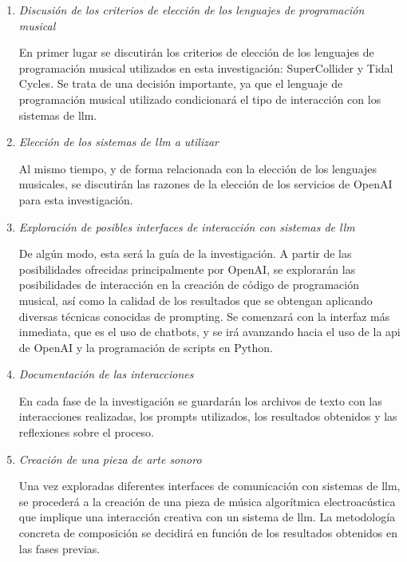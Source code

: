 \begin{enumerate}
    \item \emph{Discusión de los criterios de elección de los lenguajes de programación musical}
    
    En primer lugar se discutirán los criterios de elección de los lenguajes de programación musical utilizados en esta investigación: SuperCollider y Tidal Cycles. Se trata de una decisión importante, ya que el lenguaje de programación musical utilizado condicionará el tipo de interacción con los sistemas de \gls{llm}.

    \item \emph{Elección de los sistemas de \gls{llm} a utilizar}
    
    Al mismo tiempo, y de forma relacionada con la elección de los lenguajes musicales, se discutirán las razones de la elección de los servicios de OpenAI para esta investigación.

    \item \emph{Exploración de posibles interfaces de interacción con sistemas de \gls{llm}}
    
    De algún modo, esta será la guía de la investigación. A partir de las posibilidades ofrecidas principalmente por OpenAI, se explorarán las posibilidades de interacción en la creación de código de programación musical, así como la calidad de los resultados que se obtengan aplicando diversas técnicas conocidas de prompting. Se comenzará con la interfaz más inmediata, que es el uso de chatbots, y se irá avanzando hacia el uso de la \gls{api} de OpenAI y la programación de scripts en Python.

    \item \emph{Documentación de las interacciones}
    
    En cada fase de la investigación se guardarán los archivos de texto con las interacciones realizadas, los prompts utilizados, los resultados obtenidos y las reflexiones sobre el proceso.

    \item \emph{Creación de una pieza de arte sonoro}
    
    Una vez exploradas diferentes interfaces de comunicación con sistemas de \gls{llm}, se procederá a la creación de una pieza de música algorítmica electroacústica que implique una interacción creativa con un sistema de \gls{llm}. La metodología concreta de composición se decidirá en función de los resultados obtenidos en las fases previas.



\end{enumerate}
